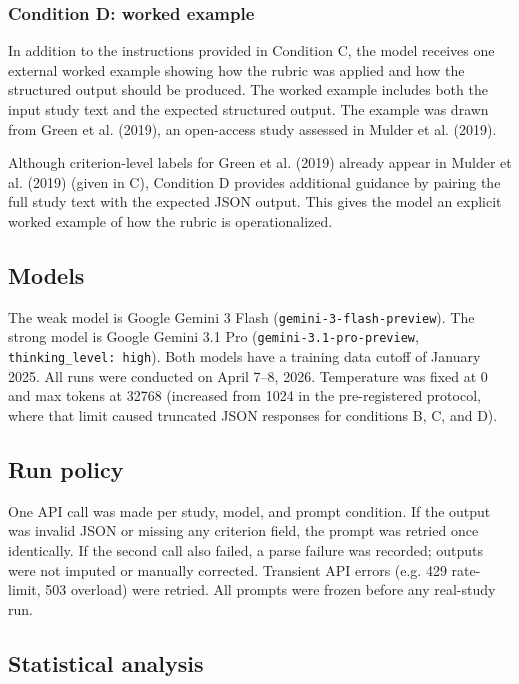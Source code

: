 \documentclass[11pt,a4paper]{article}
\begin{document}
\subsubsection{Condition D: worked example}

In addition to the instructions provided in Condition C, the model receives one external worked example showing how the rubric was applied and how the structured output should be produced. The worked example includes both the input study text and the expected structured output. The example was drawn from Green et al. (2019), an open-access study assessed in Mulder et al. (2019).

Although criterion-level labels for Green et al. (2019) already appear in Mulder et al. (2019) (given in C), Condition D provides additional guidance by pairing the full study text with the expected JSON output. This gives the model an explicit worked example of how the rubric is operationalized.

\subsection{Models}

The weak model is Google Gemini 3 Flash (\texttt{gemini-3-flash-preview}). The strong model is Google Gemini 3.1 Pro (\texttt{gemini-3.1-pro-preview}, \texttt{thinking\_level: high}). Both models have a training data cutoff of January 2025. All runs were conducted on April 7–8, 2026. Temperature was fixed at 0 and max tokens at 32768 (increased from 1024 in the pre-registered protocol, where that limit caused truncated JSON responses for conditions B, C, and D).

\subsection{Run policy}

One API call was made per study, model, and prompt condition. If the output was invalid JSON or missing any criterion field, the prompt was retried once identically. If the second call also failed, a parse failure was recorded; outputs were not imputed or manually corrected. Transient API errors (e.g. 429 rate-limit, 503 overload) were retried. All prompts were frozen before any real-study run.

\subsection{Statistical analysis}
\end{document}
